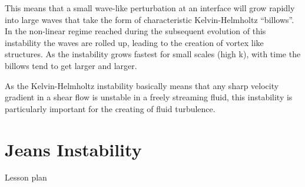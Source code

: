 This means that a small wave-like perturbation at an interface will
grow rapidly into large waves that take the form of characteristic Kelvin-Helmholtz
``billows''. In the non-linear regime reached during the subsequent evolution of this
instability the waves are rolled up, leading to the creation of vortex like structures.
As the instability grows fastest for small scales (high k), with time the billows tend
to get larger and larger.

As the Kelvin-Helmholtz instability basically means that any sharp
velocity gradient in a shear flow is unstable in a freely streaming
fluid, this instability is particularly important for the creating of
fluid turbulence.

\section{Jeans Instability}

Lesson plan


